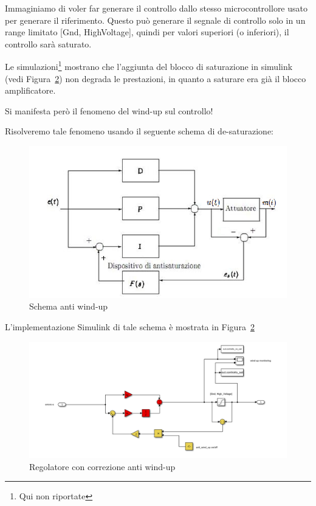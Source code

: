 \documentclass[a4paper,12pt]{article}
\begin{document}
Immaginiamo di voler far generare il controllo dallo stesso microcontrollore usato per generare il riferimento.
Questo può generare il segnale di controllo solo in un range limitato [Gnd, HighVoltage], quindi per valori superiori (o inferiori), il controllo sarà saturato.

Le simulazioni\footnote{Qui non riportate} mostrano che l'aggiunta del blocco di saturazione in simulink (vedi Figura~\ref{fig: regolatoreAntiWU})  non degrada le prestazioni, in quanto a saturare era già il blocco amplificatore.

Si manifesta però il fenomeno del wind-up sul controllo!

\vspace{0.5cm}

Risolveremo tale fenomeno usando il seguente schema di de-saturazione:
\begin{figure}[h!]
    \centering
    \includegraphics[scale=0.7]{Immagini/Altre/antiwindupSchema.PNG}
    \caption{Schema anti wind-up}
    \label{fig:antiWindup}
\end{figure}

\vspace{0.5cm}

L'implementazione Simulink di tale schema è mostrata in Figura~\ref{fig: regolatoreAntiWU}

\begin{figure}[h!]
    \centering
    \includegraphics[scale = 0.6]{Immagini/Altre/regolatoreDesaturatoSimulink.PNG}
    \caption{Regolatore con correzione anti wind-up}
    \label{fig: regolatoreAntiWU}
\end{figure}
\end{document}
